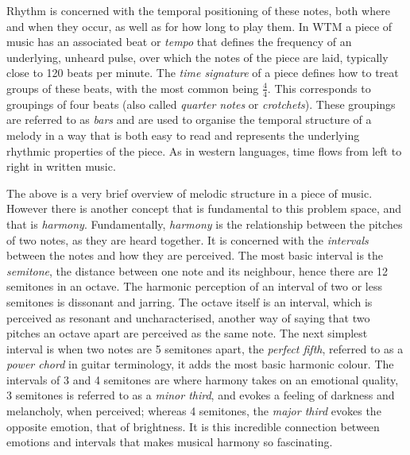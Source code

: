 \documentclass[bsc,singlespacing,logo, parskip, deptreport]{infthesis}
\begin{document}
Rhythm is concerned with the temporal positioning of these notes, both where and when they occur, as well as for how long to play them. In WTM a piece of music has an associated beat or {\em tempo} that defines the frequency of an underlying, unheard pulse, over which the notes of the piece are laid, typically close to 120 beats per minute. The {\em time signature} of a piece defines how to treat groups of these beats, with the most common being $\frac{4}{4}$. This corresponds to groupings of four beats (also called {\em quarter notes} or {\em crotchets}). These groupings are referred to as {\em bars} and are used to organise the temporal structure of a melody in a way that is both easy to read and represents the underlying rhythmic properties of the piece. As in western languages, time flows from left to right in written music.

The above is a very brief overview of melodic structure in a piece of music. However there is another concept that is fundamental to this problem space, and that is {\em harmony}. Fundamentally, {\em harmony} is the relationship between the pitches of two notes, as they are heard together. It is concerned with the {\em intervals} between the notes and how they are perceived. The most basic interval is the {\em semitone}, the distance between one note and its neighbour, hence there are 12 semitones in an octave. The harmonic perception of an interval of two or less semitones is dissonant and jarring. The octave itself is an interval, which is perceived as resonant and uncharacterised, another way of saying that two pitches an octave apart are perceived as the same note. The next simplest interval is when two notes are 5 semitones apart, the {\em perfect fifth}, referred to as a {\em power chord} in guitar terminology, it adds the most basic harmonic colour. The intervals of 3 and 4 semitones are where harmony takes on an emotional quality, 3 semitones is referred to as a {\em minor third}, and evokes a feeling of darkness and melancholy, when perceived; whereas 4 semitones, the {\em major third} evokes the opposite emotion, that of brightness. It is this incredible connection between emotions and intervals that makes musical harmony so fascinating.

\begin{center}
  {%
\parindent 0pt
\noindent
\ifx\preLilyPondExample \undefined
\else
  \expandafter\preLilyPondExample
\fi
\def\lilypondbook{}%

\ifx\postLilyPondExample \undefined
\else
  \expandafter\postLilyPondExample
\fi
}
\end{center}
\end{document}

